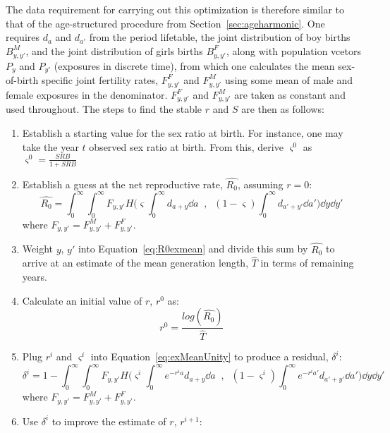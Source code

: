The data requirement for carrying out this optimization is therefore similar to
that of the age-structured procedure from Section~\ref{sec:ageharmonic}. One
requires $d_a$ and $d_{a'}$ from the period lifetable, the joint distribution
of boy births $B_{y,y'}^M$, and the joint distribution of girls
births $B_{y,y'}^F$, along with population vcetors $P_y$ and $P_{y'}$ (exposures
in discrete time), from which one calculates the mean sex-of-birth
specific joint fertility rates, $F_{y,y'}^F$ and $F_{y,y'}^M$ using some mean of
male and female exposures in the denominator. $F_{y,y'}^F$ and $F_{y,y'}^M$ are
taken as constant and used throughout. The steps to find the stable $r$ and $S$
are then as follows:
\begin{enumerate}
  \item Establish a starting value for the sex ratio at birth. For instance, one
  may take the year $t$ observed sex ratio at birth. From this, derive
  $\varsigma^0$ as $\varsigma^0 = \frac{SRB}{1+SRB}$
  \item Establish a guess at the net reproductive rate, $\widehat{R_0}$,
  assuming $r = 0$:
  \begin{equation}
  \label{eq:R0exmean}
  \widehat{R_0} = \int_0^\infty \int_0^\infty F_{y,y'} H\Bigg(\varsigma \int _0^\infty
 d_{a+y}\dd a\;\;,\;\; (1-\varsigma) \int _0^\infty
 d_{a'+y'} \dd a'\Bigg) \dd y \dd y'
  \end{equation}
  where $F_{y,y'} = F_{y,y'}^M + F_{y,y'}^F$.
  \item Weight $y$, $y'$ into Equation~\eqref{eq:R0exmean} and divide this sum
  by $\widehat{R_0}$ to arrive at an estimate of the mean generation length,
  $\widehat{T}$ in terms of remaining years. 
  \item Calculate an initial value of $r$, $r^0$ as:
  \begin{equation}
  r^0 = \frac{log(\widehat{R_0})}{\widehat{T}}
  \end{equation}
  \item Plug $r^i$ and $\varsigma^i$ into Equation~\eqref{eq:exMeanUnity} to
  produce a residual, $\delta^i$:
  \begin{equation}
 \label{eq:exMeanUnity}
 \delta^i = 1 - \int_0^\infty \int_0^\infty F_{y,y'} H\Bigg(\varsigma^i \int
 _0^\infty e^{-r^ia}d_{a+y}\dd a\;\;,\;\; (1-\varsigma^i) \int _0^\infty
 e^{-r^ia'}d_{a'+y'} \dd a'\Bigg) \dd y \dd y'
 \end{equation}
where $F_{y,y'} = F_{y,y'}^M + F_{y,y'}^F$.
  \item  Use $\delta^i$ to improve the estimate of $r$, $r^{i+1}$:

\end{enumerate}
